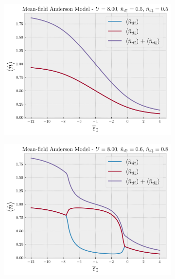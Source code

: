 \documentclass[a4paper,fleqn,12pt]{article}
\begin{document}
\begin{figure}[H]
\centering
\begin{subfigure}{.5\textwidth}
  \centering
  \includegraphics[width=\linewidth]{fig/plot-U_8.0-up_0.5-down_0.5.png}
\end{subfigure}%
\begin{subfigure}{.5\textwidth}
  \centering
  \includegraphics[width=\linewidth]{fig/plot-U_8.0-up_0.6-down_0.8.png}
\end{subfigure}
\end{figure}
\end{document}
